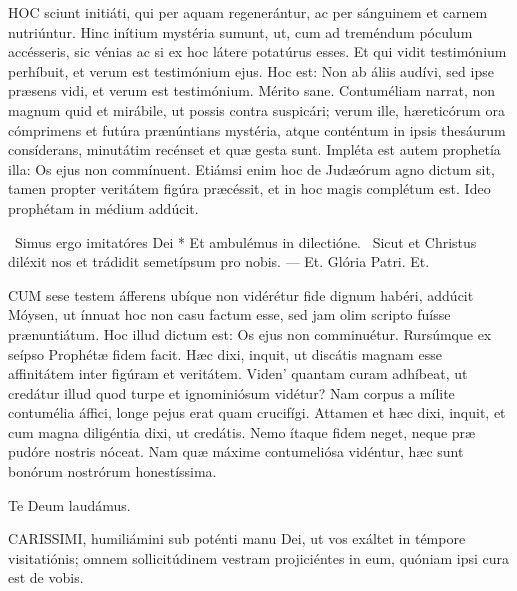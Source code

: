 
\lettrine[lines=2]{H}{OC} sciunt initiáti, qui per aquam regenerántur, ac per sánguinem et carnem nutriúntur. Hinc inítium mystéria sumunt, ut, cum ad treméndum póculum accésseris, sic vénias ac si ex hoc látere potatúrus esses. Et qui vidit testimónium perhíbuit, et verum est testimónium ejus. Hoc est: Non ab áliis audívi, sed ipse præsens vidi, et verum est testimónium. Mérito sane. Contuméliam narrat, non magnum quid et mirábile, ut possis contra suspicári; verum ille, hæreticórum ora cómprimens et futúra prænúntians mystéria, atque conténtum in ipsis thesáurum consíderans, minutátim recénset et quæ gesta sunt. Impléta est autem prophetía illa: Os ejus non commínuent. Etiámsi enim hoc de Judæórum agno dictum sit, tamen propter veritátem figúra præcéssit, et in hoc magis complétum est. Ideo prophétam in médium addúcit.

\R\ Simus ergo imitatóres Dei * Et ambulémus in dilectióne. \V\ Sicut et Christus diléxit nos et trádidit semetípsum pro nobis. --- Et. Glória Patri. Et.


\lettrine[lines=2]{C}{UM} sese testem áfferens ubíque non vidérétur fide dignum habéri, addúcit Móysen, ut ínnuat hoc non casu factum esse, sed jam olim scripto fuísse prænuntiátum. Hoc illud dictum est: Os ejus non comminuétur. Rursúmque ex seípso Prophétæ fidem facit. Hæc dixi, inquit, ut discátis magnam esse affinitátem inter figúram et veritátem. Viden' quantam curam adhíbeat, ut credátur illud quod turpe et ignominiósum vidétur? Nam corpus a mílite contumélia áffici, longe pejus erat quam crucifígi. Attamen et hæc dixi, inquit, et cum magna diligéntia dixi, ut credátis. Nemo ítaque fidem neget, neque præ pudóre nostris nóceat. Nam quæ máxime contumeliósa vidéntur, hæc sunt bonórum nostrórum honestíssima.

Te Deum laudámus.







\lettrine[lines=2]{C}{ARISSIMI}, humiliámini sub poténti manu Dei, ut vos exáltet in témpore visitatiónis; omnem sollicitúdinem vestram projiciéntes in eum, quóniam ipsi cura est de vobis.


